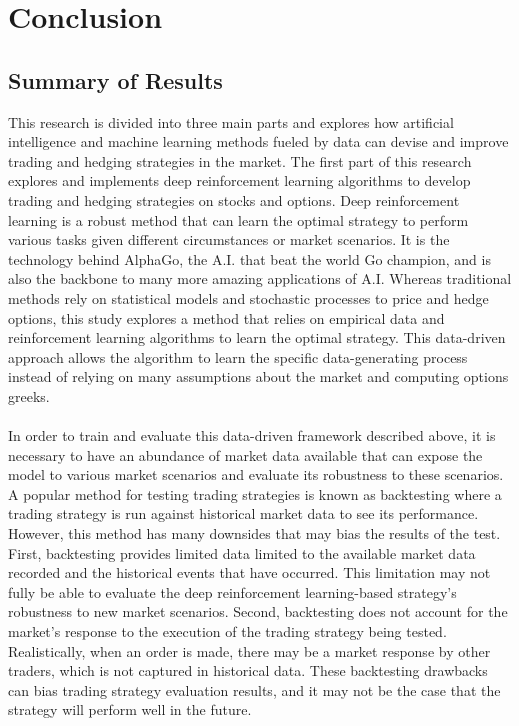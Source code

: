 \chapter{Conclusion}
\section{Summary of Results}
This research is divided into three main parts and explores how artificial intelligence and machine learning methods fueled by data can devise and improve trading and hedging strategies in the market. The first part of this research explores and implements deep reinforcement learning algorithms to develop trading and hedging strategies on stocks and options. Deep reinforcement learning is a robust method that can learn the optimal strategy to perform various tasks given different circumstances or market scenarios. It is the technology behind AlphaGo, the A.I. that beat the world Go champion, and is also the backbone to many more amazing applications of A.I. Whereas traditional methods rely on statistical models and stochastic processes to price and hedge options, this study explores a method that relies on empirical data and reinforcement learning algorithms to learn the optimal strategy. This data-driven approach allows the algorithm to learn the specific data-generating process instead of relying on many assumptions about the market and computing options greeks.
\\
\\
In order to train and evaluate this data-driven framework described above, it is necessary to have an abundance of market data available that can expose the model to various market scenarios and evaluate its robustness to these scenarios. A popular method for testing trading strategies is known as backtesting where a trading strategy is run against historical market data to see its performance. However, this method has many downsides that may bias the results of the test. First, backtesting provides limited data limited to the available market data recorded and the historical events that have occurred. This limitation may not fully be able to evaluate the deep reinforcement learning-based strategy's robustness to new market scenarios. Second, backtesting does not account for the market's response to the execution of the trading strategy being tested. Realistically, when an order is made, there may be a market response by other traders, which is not captured in historical data. These backtesting drawbacks can bias trading strategy evaluation results, and it may not be the case that the strategy will perform well in the future.

